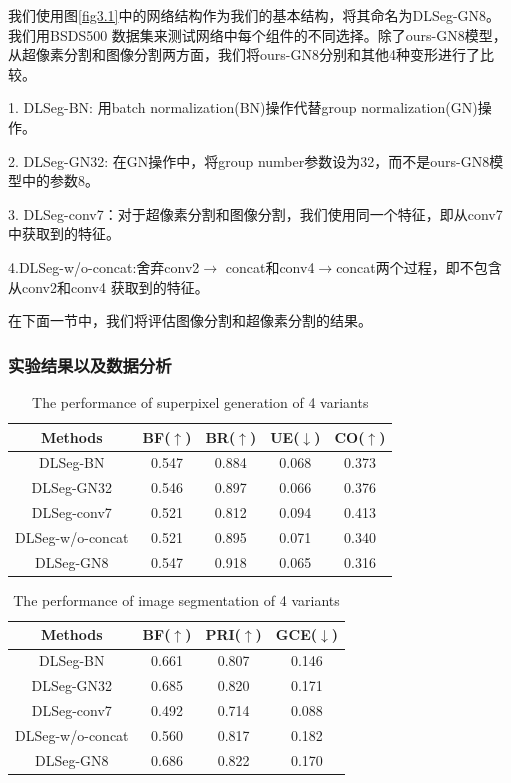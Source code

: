 我们使用图\ref{fig3.1}中的网络结构作为我们的基本结构，将其命名为DLSeg-GN8。我们用BSDS500 数据集来测试网络中每个组件的不同选择。除了ours-GN8模型，从超像素分割和图像分割两方面，我们将ours-GN8分别和其他4种变形进行了比较。

1. DLSeg-BN: 用batch normalization(BN)操作代替group normalization(GN)操作。

2. DLSeg-GN32: 在GN操作中，将group number参数设为32，而不是ours-GN8模型中的参数8。

3. DLSeg-conv7：对于超像素分割和图像分割，我们使用同一个特征，即从conv7中获取到的特征。

4.DLSeg-w/o-concat:舍弃conv2$\rightarrow$ concat和conv4$\rightarrow$concat两个过程，即不包含从conv2和conv4 获取到的特征。

在下面一节中，我们将评估图像分割和超像素分割的结果。

\subsubsection{实验结果以及数据分析}

\begin{table}[htbp]
\caption{The performance of superpixel generation of 4 variants}
\label{tab1}
\vspace{0.5em}\centering\wuhao
\begin{tabular}{ccccc}
\toprule[1.5pt]
Methods & BF($\uparrow$) & BR($\uparrow$) & UE($\downarrow$) & CO($\uparrow$) \\
\midrule[1pt]
DLSeg-BN         & 0.547 & 0.884 & 0.068 & 0.373\\
DLSeg-GN32       & 0.546 & 0.897 & 0.066 & 0.376\\
DLSeg-conv7      & 0.521 & 0.812 & 0.094 & 0.413\\
DLSeg-w/o-concat & 0.521 & 0.895 & 0.071 & 0.340\\
\midrule[1pt]
DLSeg-GN8        & 0.547 & 0.918 & 0.065 & 0.316\\
\bottomrule[1.5pt]
\end{tabular}
\end{table}

\begin{table}[htbp]
\caption{The performance of image segmentation of 4 variants}
\label{tab2}
\vspace{0.5em}\centering\wuhao
\begin{tabular}{cccc}
\toprule[1.5pt]
Methods & BF($\uparrow$) & PRI($\uparrow$) & GCE($\downarrow$) \\
\midrule[1pt]
DLSeg-BN          & 0.661 & 0.807 & 0.146 \\
DLSeg-GN32        & 0.685 & 0.820 & 0.171 \\
DLSeg-conv7       & 0.492 & 0.714 & 0.088\\
DLSeg-w/o-concat  & 0.560 & 0.817 & 0.182 \\
\midrule[1pt]
DLSeg-GN8         & 0.686 & 0.822 & 0.170 \\
\bottomrule[1.5pt]
\end{tabular}
\vspace{\baselineskip}
\end{table}

